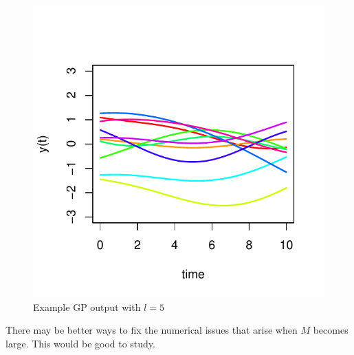 \documentclass[a4paper,11pt]{article}\usepackage[]{graphicx}\usepackage[]{color}
\makeatletter
\def\maxwidth{ %
  \ifdim\Gin@nat@width>\linewidth
    \linewidth
  \else
    \Gin@nat@width
  \fi
}
\newenvironment{knitrout}{}{} %
\makeatother
\begin{document}
\begin{knitrout}
\color{fgcolor}\begin{figure}

{\centering \includegraphics[width=\maxwidth]{figure/unnamed-chunk-21-1} 

}

\caption[Example GP output with ]{Example GP output with $l=5$}\label{fig:unnamed-chunk-21}
\end{figure}


\end{knitrout}

There may be better ways to fix the numerical issues that arise when $M$ becomes large. This would be good to study. 
\end{document}
